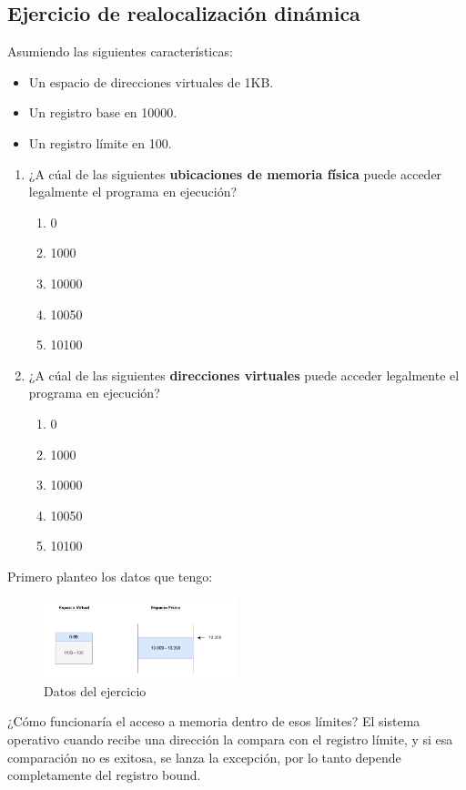 \documentclass{article}
\begin{document}
\subsection{Ejercicio de realocalización dinámica}
Asumiendo las siguientes características:
\begin{itemize}
    \item Un espacio de direcciones virtuales de 1KB.
    \item Un registro base en 10000.
    \item Un registro límite en 100.
\end{itemize}
\begin{enumerate}
    \item ¿A cúal de las siguientes \textbf{ubicaciones de memoria física} puede acceder legalmente el programa en ejecución?
    \begin{enumerate}
        \item 0
        \item 1000
        \item 10000
        \item 10050
        \item 10100
    \end{enumerate}
    \item ¿A cúal de las siguientes \textbf{direcciones virtuales} puede acceder legalmente el programa en ejecución?
    \begin{enumerate}
        \item 0
        \item 1000
        \item 10000
        \item 10050
        \item 10100
    \end{enumerate}
\end{enumerate}

Primero planteo los datos que tengo:

\begin{figure}[h]
    \centering
    \includegraphics[width=0.5\textwidth]{src/ejtrad.pdf}
    \caption{Datos del ejercicio}
\end{figure}

¿Cómo funcionaría el acceso a memoria dentro de esos límites? El sistema operativo cuando recibe una dirección la compara con el registro límite, y si esa comparación no es exitosa, se lanza la excepción, por lo tanto depende completamente del registro bound.
\end{document}
